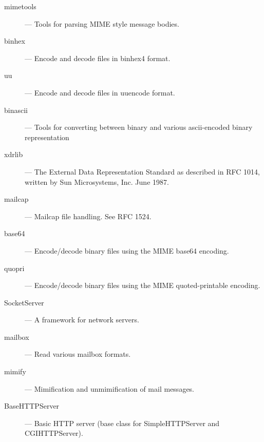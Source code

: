 \begin{description}
\item[mimetools]
--- Tools for parsing MIME style message bodies.

\item[binhex]
--- Encode and decode files in binhex4 format.

\item[uu]
--- Encode and decode files in uuencode format.

\item[binascii]
--- Tools for converting between binary and various ascii-encoded binary 
representation

\item[xdrlib]
--- The External Data Representation Standard as described in RFC 1014,
written by Sun Microsystems, Inc. June 1987.

\item[mailcap]
--- Mailcap file handling.  See RFC 1524.

\item[base64]
--- Encode/decode binary files using the MIME base64 encoding.

\item[quopri]
--- Encode/decode binary files using the MIME quoted-printable encoding.

\item[SocketServer]
--- A framework for network servers.

\item[mailbox]
--- Read various mailbox formats.

\item[mimify]
--- Mimification and unmimification of mail messages.

\item[BaseHTTPServer]
--- Basic HTTP server (base class for SimpleHTTPServer and CGIHTTPServer).

\end{description}
